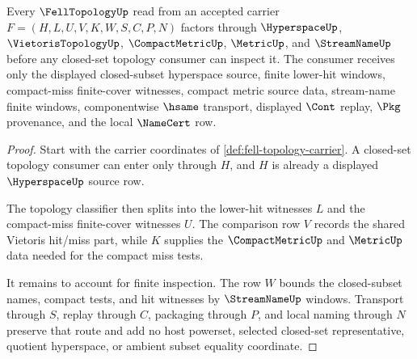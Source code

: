 \begin{theorem}
\label{thm:fell-topology-vietoris-hyperspace-handoff}
Every $\FellTopologyUp$ read from an accepted carrier $F=(H,L,U,V,K,W,S,C,P,N)$ factors through $\HyperspaceUp$, $\VietorisTopologyUp$, $\CompactMetricUp$, $\MetricUp$, and $\StreamNameUp$ before any closed-set topology consumer can inspect it. The consumer receives only the displayed closed-subset hyperspace source, finite lower-hit windows, compact-miss finite-cover witnesses, compact metric source data, stream-name finite windows, componentwise $\hsame$ transport, displayed $\Cont$ replay, $\Pkg$ provenance, and the local $\NameCert$ row.
\end{theorem}
\begin{proof}
Start with the carrier coordinates of \autoref{def:fell-topology-carrier}. A closed-set topology consumer can enter only through $H$, and $H$ is already a displayed $\HyperspaceUp$ source row.

The topology classifier then splits into the lower-hit witnesses $L$ and the compact-miss finite-cover witnesses $U$. The comparison row $V$ records the shared Vietoris hit/miss part, while $K$ supplies the $\CompactMetricUp$ and $\MetricUp$ data needed for the compact miss tests.

It remains to account for finite inspection. The row $W$ bounds the closed-subset names, compact tests, and hit witnesses by $\StreamNameUp$ windows. Transport through $S$, replay through $C$, packaging through $P$, and local naming through $N$ preserve that route and add no host powerset, selected closed-set representative, quotient hyperspace, or ambient subset equality coordinate.
\end{proof}


\begin{closurestatus}{\FellTopologyUp}
  \theoryclosure{\seedClosure}
  \formalstatus{\unformalizedV}
\end{closurestatus}
